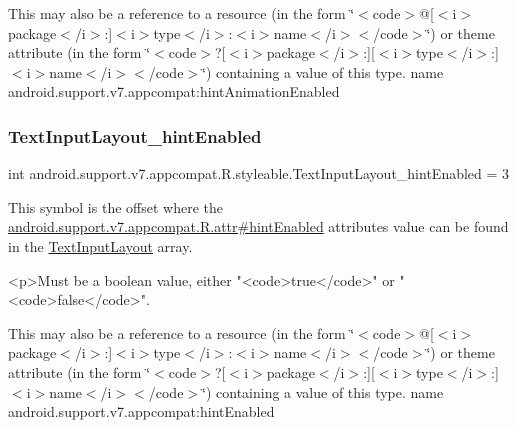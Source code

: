 This may also be a reference to a resource (in the form \char`\"{}$<$code$>$@\mbox{[}$<$i$>$package$<$/i$>$\+:\mbox{]}$<$i$>$type$<$/i$>$\+:$<$i$>$name$<$/i$>$$<$/code$>$\char`\"{}) or theme attribute (in the form \char`\"{}$<$code$>$?\mbox{[}$<$i$>$package$<$/i$>$\+:\mbox{]}\mbox{[}$<$i$>$type$<$/i$>$\+:\mbox{]}$<$i$>$name$<$/i$>$$<$/code$>$\char`\"{}) containing a value of this type.  name android.\+support.\+v7.\+appcompat\+:hint\+Animation\+Enabled \mbox{\label{classandroid_1_1support_1_1v7_1_1appcompat_1_1R_1_1styleable_a20426c1cbc9060134282fe9a4c3a60dc}} 
\subsubsection{\texorpdfstring{Text\+Input\+Layout\+\_\+hint\+Enabled}{TextInputLayout\_hintEnabled}}
{\footnotesize\ttfamily int android.\+support.\+v7.\+appcompat.\+R.\+styleable.\+Text\+Input\+Layout\+\_\+hint\+Enabled = 3\hspace{0.3cm}{\ttfamily [static]}}

This symbol is the offset where the \hyperlink{classandroid_1_1support_1_1v7_1_1appcompat_1_1R_1_1attr_a25854ee3954a7a1193b311c5af21a879}{android.\+support.\+v7.\+appcompat.\+R.\+attr\#hint\+Enabled} attribute\textquotesingle{}s value can be found in the \hyperlink{classandroid_1_1support_1_1v7_1_1appcompat_1_1R_1_1styleable_a618db13ebe8aab96f9d951a0d1c7d5bc}{Text\+Input\+Layout} array.

\begin{DoxyVerb}      <p>Must be a boolean value, either "<code>true</code>" or "<code>false</code>".
\end{DoxyVerb}
 

This may also be a reference to a resource (in the form \char`\"{}$<$code$>$@\mbox{[}$<$i$>$package$<$/i$>$\+:\mbox{]}$<$i$>$type$<$/i$>$\+:$<$i$>$name$<$/i$>$$<$/code$>$\char`\"{}) or theme attribute (in the form \char`\"{}$<$code$>$?\mbox{[}$<$i$>$package$<$/i$>$\+:\mbox{]}\mbox{[}$<$i$>$type$<$/i$>$\+:\mbox{]}$<$i$>$name$<$/i$>$$<$/code$>$\char`\"{}) containing a value of this type.  name android.\+support.\+v7.\+appcompat\+:hint\+Enabled \mbox{\label{classandroid_1_1support_1_1v7_1_1appcompat_1_1R_1_1styleable_a49690b12689de9f06e6a52752ca6f259}} 

